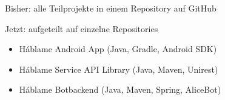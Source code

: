\begin{frame}
\begin{block}{}
	Bisher: alle Teilprojekte in einem Repository auf GitHub
\end{block}
\begin{block}{}
	Jetzt: aufgeteilt auf einzelne Repositories
\end{block}
\begin{block}{}
	\begin{itemize}\itemsep0pt
		\item Háblame Android App (Java, Gradle, Android SDK)
		\item Háblame Service API Library (Java, Maven, Unirest)
		\item Háblame Botbackend (Java, Maven, Spring, AliceBot)
	\end{itemize}
\end{block}
\end{frame}